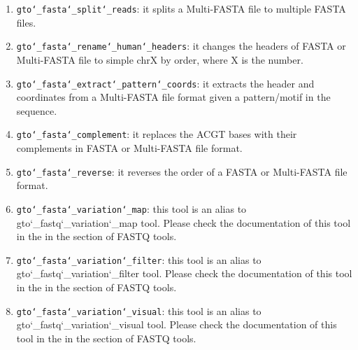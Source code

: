 \begin{enumerate}
\item \texttt{gto\char`_fasta\char`_split\char`_reads}: it splits a Multi-FASTA file to multiple FASTA files.

\item \texttt{gto\char`_fasta\char`_rename\char`_human\char`_headers}: it changes the headers of FASTA or Multi-FASTA file to simple chrX by order, where X is the number.

\item \texttt{gto\char`_fasta\char`_extract\char`_pattern\char`_coords}: it extracts the header and coordinates from a Multi-FASTA file format given a pattern/motif in the sequence.

\item \texttt{gto\char`_fasta\char`_complement}: it replaces the ACGT bases with their complements in FASTA or Multi-FASTA file format.

\item \texttt{gto\char`_fasta\char`_reverse}: it reverses the order of a FASTA or Multi-FASTA file format.

\item \texttt{gto\char`_fasta\char`_variation\char`_map}: this tool is an alias to gto\char`_fastq\char`_variation\char`_map tool. Please check the documentation of this tool in the in the section of FASTQ tools. 

\item \texttt{gto\char`_fasta\char`_variation\char`_filter}: this tool is an alias to gto\char`_fastq\char`_variation\char`_filter tool. Please check the documentation of this tool in the in the section of FASTQ tools. 

\item \texttt{gto\char`_fasta\char`_variation\char`_visual}: this tool is an alias to gto\char`_fastq\char`_variation\char`_visual tool. Please check the documentation of this tool in the in the section of FASTQ tools. 

\end{enumerate}





 








